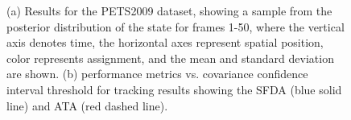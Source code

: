 \documentclass[smallcondensed, final]{svjour3}
\begin{document}
\begin{figure}[!]
  \centering
  \hspace{4mm}
  \caption{ (a) Results for the PETS2009 dataset, showing a sample from the posterior distribution of the state for frames 1-50, where the vertical axis denotes time, the horizontal axes represent spatial position, color represents assignment, and the mean and standard deviation are shown. (b) performance metrics vs. covariance confidence interval threshold for tracking results showing the SFDA (blue solid line) and ATA (red dashed line).}
  \label{fig:pets2009_results}
\end{figure}
\end{document}
